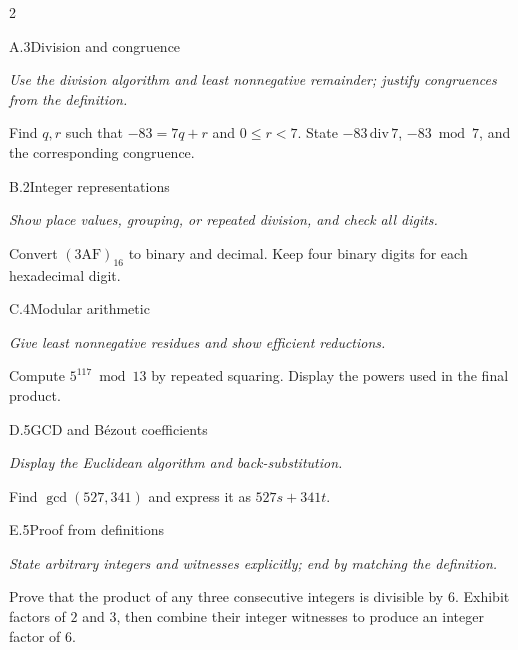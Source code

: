 \documentclass[9pt]{extarticle}
\begin{document}
\begin{multicols}{2}
\begin{CoreProblem}{A.3}{Division and congruence}
{\scriptsize\textit{Use the division algorithm and least nonnegative remainder; justify congruences from the definition.}\par}
Find $q,r$ such that $-83=7q+r$ and $0\le r<7$. State
$-83\,\mathrm{div}\,7$, $-83\bmod7$, and the corresponding congruence.
\end{CoreProblem}
\begin{CoreProblem}{B.2}{Integer representations}
{\scriptsize\textit{Show place values, grouping, or repeated division, and check all digits.}\par}
Convert $(\mathrm{3AF})_{16}$ to binary and decimal. Keep four binary digits
for each hexadecimal digit.
\end{CoreProblem}
\begin{CoreProblem}{C.4}{Modular arithmetic}
{\scriptsize\textit{Give least nonnegative residues and show efficient reductions.}\par}
Compute $5^{117}\bmod13$ by repeated squaring. Display the powers used in the
final product.
\end{CoreProblem}
\columnbreak
\begin{CoreProblem}{D.5}{GCD and B\'ezout coefficients}
{\scriptsize\textit{Display the Euclidean algorithm and back-substitution.}\par}
Find $\gcd(527,341)$ and express it as $527s+341t$.
\end{CoreProblem}
\begin{CoreProblem}{E.5}{Proof from definitions}
{\scriptsize\textit{State arbitrary integers and witnesses explicitly; end by matching the definition.}\par}
Prove that the product of any three consecutive integers is divisible by $6$.
Exhibit factors of $2$ and $3$, then combine their integer witnesses to
produce an integer factor of $6$.
\end{CoreProblem}
\end{multicols}
\CoreWorkArea
\FormBreak
{}
\end{document}
